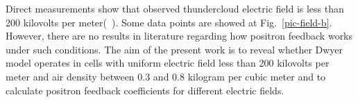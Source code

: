 \documentclass[utf8]{webofc}
\begin{document}
    Direct measurements show that observed thundercloud electric field is less than 200 kilovolts per  meter(~\cite{mazin1989clouds, marshall1995electric}). Some data points are showed at Fig.~\ref{pic-field-b}. However, there are no results in literature regarding how positron feedback works under such conditions. The aim of the present work is to reveal whether Dwyer model operates in cells with uniform electric field less than 200 kilovolts per meter and air density between 0.3 and 0.8 kilogram per cubic meter and to calculate positron feedback coefficients for different electric fields. %
    
\end{document}
